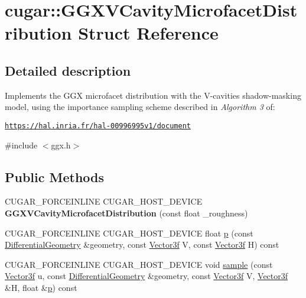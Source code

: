\hypertarget{structcugar_1_1_g_g_x_v_cavity_microfacet_distribution}{}\section{cugar\+:\+:G\+G\+X\+V\+Cavity\+Microfacet\+Distribution Struct Reference}
\label{structcugar_1_1_g_g_x_v_cavity_microfacet_distribution}


\subsection{Detailed description}
Implements the G\+GX microfacet distribution with the V-\/cavities shadow-\/masking model, using the importance sampling scheme described in {\itshape Algorithm 3} of\+:

\href{https://hal.inria.fr/hal-00996995v1/document}{\tt https\+://hal.\+inria.\+fr/hal-\/00996995v1/document} 

{\ttfamily \#include $<$ggx.\+h$>$}

\subsection*{Public Methods}
\begin{DoxyCompactItemize}
\item 
\mbox{\label{structcugar_1_1_g_g_x_v_cavity_microfacet_distribution_a52ba0e718af5304feb075936398270a4}} 
C\+U\+G\+A\+R\+\_\+\+F\+O\+R\+C\+E\+I\+N\+L\+I\+NE C\+U\+G\+A\+R\+\_\+\+H\+O\+S\+T\+\_\+\+D\+E\+V\+I\+CE {\bfseries G\+G\+X\+V\+Cavity\+Microfacet\+Distribution} (const float \+\_\+roughness)
\item 
C\+U\+G\+A\+R\+\_\+\+F\+O\+R\+C\+E\+I\+N\+L\+I\+NE C\+U\+G\+A\+R\+\_\+\+H\+O\+S\+T\+\_\+\+D\+E\+V\+I\+CE float \hyperlink{structcugar_1_1_g_g_x_v_cavity_microfacet_distribution_ad7ae12c7575dedd7365af16044376fef}{p} (const \hyperlink{structcugar_1_1_differential_geometry}{Differential\+Geometry} \&geometry, const \hyperlink{structcugar_1_1_vector}{Vector3f} V, const \hyperlink{structcugar_1_1_vector}{Vector3f} H) const
\item 
C\+U\+G\+A\+R\+\_\+\+F\+O\+R\+C\+E\+I\+N\+L\+I\+NE C\+U\+G\+A\+R\+\_\+\+H\+O\+S\+T\+\_\+\+D\+E\+V\+I\+CE void \hyperlink{structcugar_1_1_g_g_x_v_cavity_microfacet_distribution_a2e4cf51c893c14ecb072d8266f942880}{sample} (const \hyperlink{structcugar_1_1_vector}{Vector3f} u, const \hyperlink{structcugar_1_1_differential_geometry}{Differential\+Geometry} \&geometry, const \hyperlink{structcugar_1_1_vector}{Vector3f} V, \hyperlink{structcugar_1_1_vector}{Vector3f} \&H, float \&\hyperlink{structcugar_1_1_g_g_x_v_cavity_microfacet_distribution_ad7ae12c7575dedd7365af16044376fef}{p}) const
\end{DoxyCompactItemize}
